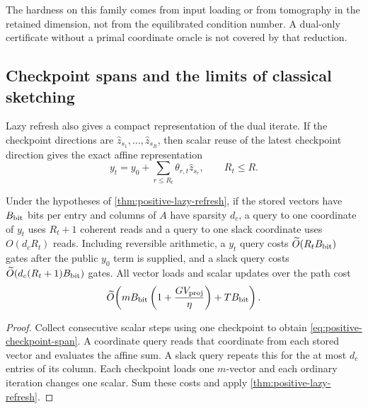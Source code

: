 The hardness on this family comes from input loading or from tomography
in the retained dimension, not from the equilibrated condition number.  A
dual-only certificate without a primal coordinate oracle is not covered by
that reduction.

\subsection{Checkpoint spans and the limits of classical sketching}
\label{sec:positive-checkpoint-span}

Lazy refresh also gives a compact representation of the dual iterate.  If the
checkpoint directions are $\widehat z_{s_1},\ldots,\widehat z_{s_R}$, then
scalar reuse of the latest checkpoint direction gives the exact affine
representation
\begin{equation}
 y_t=y_0+\sum_{r\leq R_t}\theta_{r,t}\widehat z_{s_r},\qquad R_t\leq R.     \label{eq:positive-checkpoint-span}
\end{equation}

\begin{theorem}
\label{thm:positive-checkpoint-span}
Under the hypotheses of \cref{thm:positive-lazy-refresh}, if the stored
vectors have $B_{\rm bit}$ bits per entry and columns of $A$
have sparsity $d_c$, a query to one coordinate of $y_t$ uses $R_t+1$
coherent reads and a query to one slack coordinate uses $O(d_cR_t)$ reads.
Including reversible arithmetic, a
$y_t$ query costs $\widetilde{O}(R_tB_{\rm bit})$ gates after the public $y_0$ term
is supplied, and a slack query costs
$\widetilde{O}(d_c(R_t+1)B_{\rm bit})$ gates.  All vector loads and scalar updates
over the path cost
\begin{equation}
 \widetilde{O}\!\left(mB_{\rm bit}
 \left(1+\frac{GV_{\rm proj}}{\eta}\right)+TB_{\rm bit}\right). \label{eq:positive-span-ledger}
\end{equation}
\end{theorem}

\begin{proof}
Collect consecutive scalar steps using one checkpoint to obtain
\eqref{eq:positive-checkpoint-span}.  A coordinate query reads that coordinate
from each stored vector and evaluates the affine sum.  A slack query repeats
this for the at most $d_c$ entries of its column.  Each checkpoint loads one
$m$-vector and each ordinary iteration changes one scalar.  Sum these costs and
apply \cref{thm:positive-lazy-refresh}.
\end{proof}

